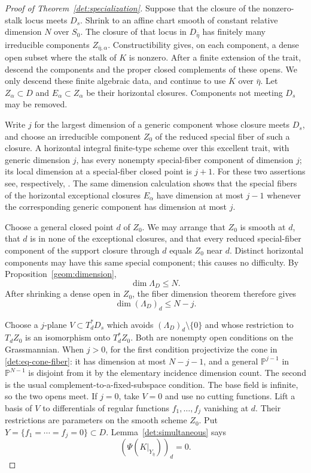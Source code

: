 \begin{proof}[Proof of Theorem~\ref{det:specialization}]
Suppose that the closure of the nonzero-stalk locus meets $D_s$.
Shrink to an affine chart smooth of constant relative dimension $N$ over
$S_0$.  The
closure of that locus in $D_{\bar\eta}$ has finitely many irreducible
components $Z_{\bar\eta,\alpha}$.  Constructibility gives, on each
component, a dense open subset where the stalk of $K$ is nonzero.
After a finite extension of the trait, descend the components and the
proper closed complements of these opens.  We only descend these finite
algebraic data, and continue to use $K$ over $\bar\eta$.
Let $Z_\alpha\subset D$ and $E_\alpha\subset Z_\alpha$ be their
horizontal closures.  Components not meeting $D_s$ may be removed.

Write $j$ for the largest dimension of a generic component whose
closure meets $D_s$, and choose an irreducible component $Z_0$ of the
reduced special fiber of such a closure.  A horizontal integral
finite-type scheme over this excellent trait, with generic dimension
$j$, has every nonempty special-fiber component of dimension $j$;
its local dimension at a special-fiber closed point is $j+1$.
For these two assertions see, respectively,
\cite[Tags 0B2J and 02JU]{Stacks}.  The same dimension calculation
shows that the special fibers of the horizontal exceptional closures
$E_\alpha$ have dimension at most $j-1$ whenever the corresponding
generic component has dimension at most $j$.

Choose a general closed point $d$ of $Z_0$.  We may arrange that $Z_0$
is smooth at $d$, that $d$ is in none of the exceptional closures,
and that every reduced special-fiber component of the support closure
through $d$ equals $Z_0$ near $d$.  Distinct horizontal components may
have this same special component; this causes no difficulty.  By
Proposition~\ref{geom:dimension},
\[
                  \dim\Lambda_D\leq N.
\]
After shrinking a dense open in $Z_0$, the fiber dimension theorem
therefore gives
\begin{equation}\label{det:eq-cone-fiber}
                    \dim(\Lambda_D)_d\leq N-j.
\end{equation}

Choose a $j$-plane $V\subset T_d^*D_s$ which avoids
$(\Lambda_D)_d\setminus\{0\}$ and whose restriction to $T_dZ_0$
is an isomorphism onto $T_d^*Z_0$.  Both are nonempty open conditions
on the Grassmannian.  When $j>0$, for the first condition projectivize the cone in
\eqref{det:eq-cone-fiber}: it has dimension at most $N-j-1$,
and a general $\mathbb P^{j-1}$ in $\mathbb P^{N-1}$ is disjoint
from it by the elementary incidence dimension count.  The second is
the usual complement-to-a-fixed-subspace condition.  The base field
is infinite, so the two opens meet.  If $j=0$, take $V=0$ and use no
cutting functions.  Lift a basis of $V$ to
differentials of regular functions $f_1,\ldots,f_j$ vanishing at $d$.
Their restrictions are parameters on the smooth scheme $Z_0$.
Put $Y=\{f_1=\cdots=f_j=0\}\subset D$.
Lemma~\ref{det:simultaneous} says
\begin{equation}\label{det:eq-final-zero}
                         (\Psi(K|_{Y_{\bar\eta}}))_d=0.
\end{equation}


\end{proof}
